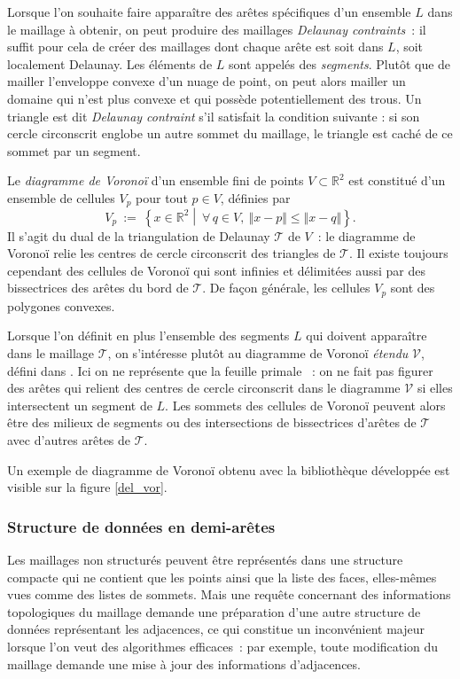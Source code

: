 \documentclass[12pt,a4paper]{report}
\begin{document}
Lorsque l'on souhaite faire apparaître des arêtes spécifiques d'un ensemble $L$ dans le maillage à obtenir, on peut produire des maillages \emph{Delaunay contraints}~: il suffit pour cela de créer des maillages dont chaque arête est soit dans $L$, soit localement Delaunay. Les éléments de $L$ sont appelés des \emph{segments}. Plutôt que de mailler l'enveloppe convexe d'un nuage de point, on peut alors mailler un domaine qui n'est plus convexe et qui possède potentiellement des trous.
Un triangle est dit \emph{Delaunay contraint} s'il satisfait la condition suivante : si son cercle circonscrit englobe un autre sommet du maillage, le triangle est \og caché \fg{} de ce sommet par un segment.
\vspace{1cm}

Le \emph{diagramme de Voronoï} d'un ensemble fini de points $V\subset\mathbb{R}^2$ est constitué d'un ensemble de cellules $V_p$ pour tout $p\in V$, définies par
\[V_p\ :=\ \left\{x\in\mathbb{R}^2\middle\vert\ \forall\,q\in V,\ \Vert x-p\Vert\leqslant\Vert x-q\Vert\right\}\text{.}\]
Il s'agit du dual de la triangulation de Delaunay $\mathcal{T}$ de $V$~: le diagramme de Voronoï relie les centres de cercle circonscrit des triangles de $\mathcal{T}$. Il existe toujours cependant des cellules de Voronoï qui sont infinies et délimitées aussi par des bissectrices des arêtes du bord de $\mathcal{T}$. De façon générale, les cellules $V_p$ sont des polygones convexes.

Lorsque l'on définit en plus l'ensemble des segments $L$ qui doivent apparaître dans le maillage $\mathcal{T}$, on s'intéresse plutôt au diagramme de Voronoï \emph{étendu} $\mathcal{V}$, défini dans \cite[pages 30-31]{Edelsbrunner}. Ici on ne représente que la \og feuille primale \fg{}~: on ne fait pas figurer des arêtes qui relient des centres de cercle circonscrit dans le diagramme $\mathcal{V}$ si elles intersectent un segment de $L$. Les sommets des cellules de Voronoï peuvent alors être des milieux de segments ou des intersections de bissectrices d'arêtes de $\mathcal{T}$ avec d'autres arêtes de $\mathcal{T}$.

Un exemple de diagramme de Voronoï obtenu avec la bibliothèque développée est visible sur la figure \ref{del_vor}.


\subsubsection{Structure de données en demi-arêtes}

Les maillages non structurés peuvent être représentés dans une structure compacte qui ne contient que les points ainsi que la liste des faces, elles-mêmes vues comme des listes de sommets. Mais une requête concernant des informations topologiques du maillage demande une préparation d'une autre structure de données représentant les adjacences, ce qui constitue un inconvénient majeur lorsque l'on veut des algorithmes efficaces~: par exemple, toute modification du maillage demande une mise à jour des informations d'adjacences.
\end{document}
